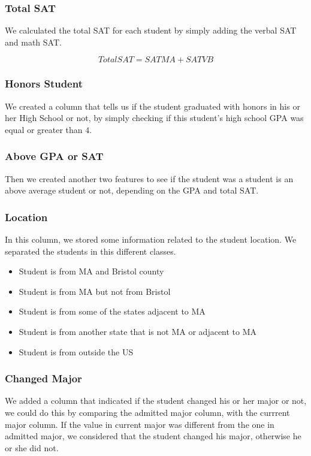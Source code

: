 \documentclass{article}
\begin{document}
\subsubsection*{Total SAT}

We calculated the total SAT for each student by simply adding the verbal SAT and math SAT.

$$TotalSAT = SATMA+SATVB$$

\subsubsection*{Honors Student}

We created a column that tells us if the student graduated with honors in his or her High School or not, by simply checking if this student's high school GPA was equal or greater than $4$.

\subsubsection*{Above GPA or SAT}

Then we created another two features to see if the student was a student is an above average student or not, depending on the GPA and total SAT.

\subsubsection*{Location}

In this column, we stored some information related to the student location. We separated the students in this different classes.

\begin{itemize}
 \item Student is from MA and Bristol county
 \item Student is from MA but not from Bristol
 \item Student is from some of the states adjacent to MA
 \item Student is from another state that is not MA or adjacent to MA
 \item Student is from outside the US
\end{itemize}

\subsubsection*{Changed Major}

We added a column that indicated if the student changed his or her major or not, we could do this by comparing the admitted major column, with the currrent major column. If the value in current major was different from the one in admitted major, we considered that the student changed his major, otherwise he or she did not.
\end{document}
